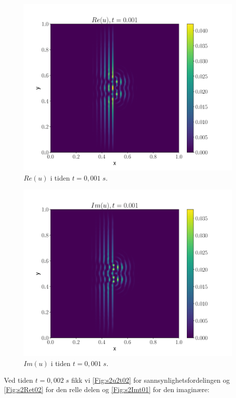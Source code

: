 \documentclass[reprint,english,notitlepage]{revtex4-2}  %
\begin{document}
\begin{figure}[H]
	\centering
	\includegraphics[scale=0.45, trim={4cm 0 0 0}]{../Images/ImshowRe0001sl2.pdf}
	\caption{$Re(u) $ i tiden $t = 0,001 \; s$.}
	\label{Fig:s2Ret01}
\end{figure}

\begin{figure}[H]
	\centering
	\includegraphics[scale=0.45, trim={4cm 0 0 0}]{../Images/ImshowIm0001sl2.pdf}
	\caption{$Im(u) $ i tiden $t = 0,001 \; s$.}
	\label{Fig:s2Imt01}
\end{figure}


Ved tiden $t = 0,002 \; s$ fikk vi \autoref{Fig:s2u2t02} for sannsynlighetsfordelingen og \autoref{Fig:s2Ret02} for den relle delen og \autoref{Fig:s2Imt01} for den imaginære:
\end{document}
